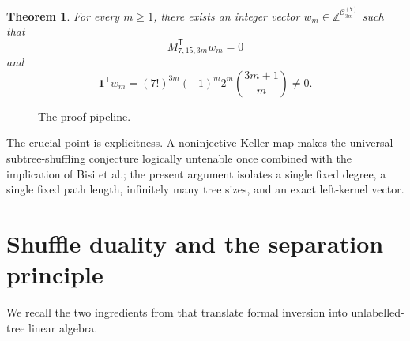 \documentclass[11pt,reqno]{amsart}
\newtheorem{theorem}{Theorem}[section]
\newcommand{\C}{\mathbb C}
\newcommand{\Z}{\mathbb Z}
\newcommand{\cC}{\mathcal C}
\newcommand{\one}{\mathbf 1}
\begin{document}
\begin{theorem}\label{thm:certificate}
For every $m\geq1$, there exists an integer vector
$w_m\in\Z^{\cC_{3m}^{(7)}}$ such that
\[
 M_{7,15,3m}^{\mathsf T}w_m=0
\]
and
\[
 \one^{\mathsf T}w_m
 =(7!)^{3m}(-1)^m2^m\binom{3m+1}{m}\neq0.
\]
\end{theorem}

\begin{figure}[ht]
\centering
{}
\caption{The proof pipeline.}
\label{fig:pipeline}
\end{figure}

The crucial point is explicitness.  A noninjective Keller map makes the
universal subtree-shuffling conjecture logically untenable once combined
with the implication of Bisi et al.; the present argument isolates a single
fixed degree, a single fixed path length, infinitely many tree sizes, and an
exact left-kernel vector.

\section{Shuffle duality and the separation principle}

We recall the two ingredients from \cite{BisiEtAl} that translate formal
inversion into unlabelled-tree linear algebra.
\end{document}
